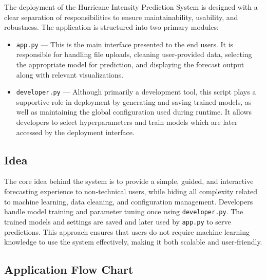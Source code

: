 The deployment of the Hurricane Intensity Prediction System is designed with a clear separation of responsibilities to ensure maintainability, usability, and robustness. The application is structured into two primary modules:

\begin{itemize}
	\item \texttt{app.py} — This is the main interface presented to the end users. It is responsible for handling file uploads, cleaning user-provided data, selecting the appropriate model for prediction, and displaying the forecast output along with relevant visualizations.
	\item \texttt{developer.py} — Although primarily a development tool, this script plays a supportive role in deployment by generating and saving trained models, as well as maintaining the global configuration used during runtime. It allows developers to select hyperparameters and train models which are later accessed by the deployment interface.
\end{itemize}

\subsection{Idea}

The core idea behind the system is to provide a simple, guided, and interactive forecasting experience to non-technical users, while hiding all complexity related to machine learning, data cleaning, and configuration management. Developers handle model training and parameter tuning once using \texttt{developer.py}. The trained models and settings are saved and later used by \texttt{app.py} to serve predictions. This approach ensures that users do not require machine learning knowledge to use the system effectively, making it both scalable and user-friendly.

\subsection{Application Flow Chart}


